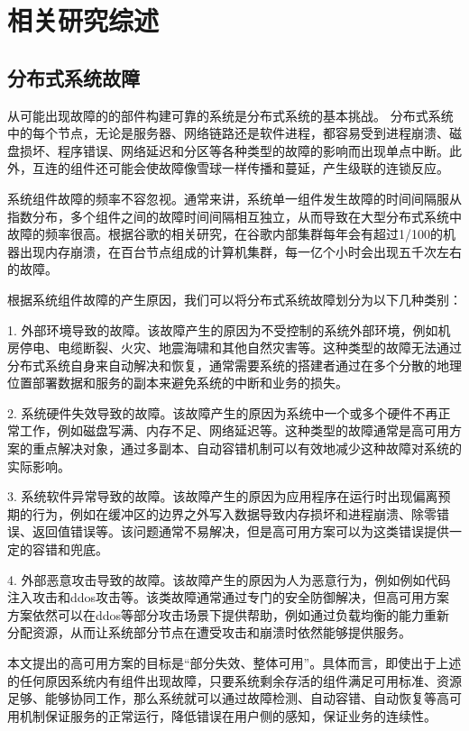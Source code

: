 
\chapter{相关研究综述}

\section{分布式系统故障}

从可能出现故障的的部件构建可靠的系统是分布式系统的基本挑战。
分布式系统中的每个节点，无论是服务器、网络链路还是软件进程，都容易受到进程崩溃、磁盘损坏、程序错误、网络延迟和分区等各种类型的故障的影响而出现单点中断。此外，互连的组件还可能会使故障像雪球一样传播和蔓延，产生级联的连锁反应。

系统组件故障的频率不容忽视。通常来讲，系统单一组件发生故障的时间间隔服从指数分布，多个组件之间的故障时间间隔相互独立，从而导致在大型分布式系统中故障的频率很高。根据谷歌的相关研究\cite{beyer2016site}，在谷歌内部集群每年会有超过1/100的机器出现内存崩溃，在百台节点组成的计算机集群，每一亿个小时会出现五千次左右的故障。

根据系统组件故障的产生原因，我们可以将分布式系统故障划分为以下几种类别\cite{michaud20062}：

1. 外部环境导致的故障。该故障产生的原因为不受控制的系统外部环境，例如机房停电、电缆断裂、火灾、地震海啸和其他自然灾害等。这种类型的故障无法通过分布式系统自身来自动解决和恢复，通常需要系统的搭建者通过在多个分散的地理位置部署数据和服务的副本来避免系统的中断和业务的损失。

2. 系统硬件失效导致的故障。该故障产生的原因为系统中一个或多个硬件不再正常工作，例如磁盘写满、内存不足、网络延迟等。这种类型的故障通常是高可用方案的重点解决对象，通过多副本、自动容错机制可以有效地减少这种故障对系统的实际影响。

3. 系统软件异常导致的故障。该故障产生的原因为应用程序在运行时出现偏离预期的行为，例如在缓冲区的边界之外写入数据导致内存损坏和进程崩溃、除零错误、返回值错误等。该问题通常不易解决，但是高可用方案可以为这类错误提供一定的容错和兜底。

4. 外部恶意攻击导致的故障。该故障产生的原因为人为恶意行为，例如例如代码注入攻击和ddos攻击等。该类故障通常通过专门的安全防御解决，但高可用方案方案依然可以在ddos等部分攻击场景下提供帮助，例如通过负载均衡的能力重新分配资源，从而让系统部分节点在遭受攻击和崩溃时依然能够提供服务。

本文提出的高可用方案的目标是“部分失效、整体可用”。具体而言，即使出于上述的任何原因系统内有组件出现故障，只要系统剩余存活的组件满足可用标准、资源足够、能够协同工作，那么系统就可以通过故障检测、自动容错、自动恢复等高可用机制保证服务的正常运行，降低错误在用户侧的感知，保证业务的连续性。

